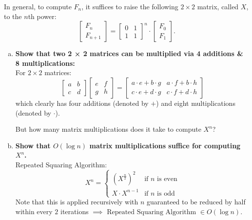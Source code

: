 \newpage
\begin{problem}{0.4}
    In general, to compute $F_n$, it suffices to raise the following $2\times 2$ matrix, called $X$, to the $n$th power:
    \[
        \begin{bmatrix}
                F_n \\
                F_{n+1}
        \end{bmatrix}
        =
        \begin{bmatrix}
                0 & 1 \\
                1 & 1
        \end{bmatrix}^n
        \cdot
        \begin{bmatrix}
                F_0 \\
                F_1
        \end{bmatrix}.
    \]
    \begin{enumerate}[(a)]
        \item \textbf{Show that two 2 × 2 matrices can be multiplied via 4 additions \& 8 multiplications:}
        \\
        For $2\times2$ matrices:
        \[
            \begin{bmatrix}
                a & b \\
                c & d
            \end{bmatrix}
            \begin{bmatrix}
                e & f \\
                g & h
            \end{bmatrix}
            =
            \begin{bmatrix}
                a\cdot e + b\cdot g & a\cdot f + b\cdot h \\
                c\cdot e + d\cdot g & c\cdot f + d\cdot h
            \end{bmatrix}
        \]
    which clearly has four additions (denoted by $+$) and eight multiplications (denoted by $\cdot$).
    
    \vspace{5 mm}
    But how many matrix multiplications does it take to compute $X^n$?

    \item \textbf{Show that $O(\log n)$ matrix multiplications suffice for computing $X^n$.}
    \\
    Repeated Squaring Algorithm:
    \[
        X^n = 
        \begin{cases}
            (X^{\frac n2})^2 &\text{if } n \text{ is even} \\
            X\cdot X^{n-1} &\text{if } n \text{ is odd}
        \end{cases}
    \]
    Note that this is applied recursively with $n$ guaranteed to be reduced by half within every $2$ iterations $\implies\text{ Repeated Squaring Algorithm }\in O(\log n)$.


\end{enumerate}
\end{problem}
